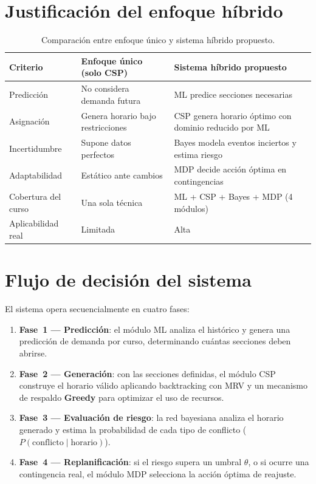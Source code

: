 \documentclass[12pt,twoside]{report}
\theoremstyle{definition}
\begin{document}
\section{Justificaci\'on del enfoque h\'ibrido}

\begin{table}[H]
\centering
\caption{Comparaci\'on entre enfoque \'unico y sistema h\'ibrido propuesto.}
\label{tab:justif}
\begin{tabularx}{\linewidth}{lXX}
\toprule
\textbf{Criterio} & \textbf{Enfoque \'unico (solo CSP)} &
  \textbf{Sistema h\'ibrido propuesto} \\
\midrule
Predicci\'on & No considera demanda futura &
  ML predice secciones necesarias \\
Asignaci\'on & Genera horario bajo restricciones &
  CSP genera horario \'optimo con dominio reducido por ML \\
Incertidumbre & Supone datos perfectos &
  Bayes modela eventos inciertos y estima riesgo \\
Adaptabilidad & Est\'atico ante cambios &
  MDP decide acci\'on \'optima en contingencias \\
Cobertura del curso & Una sola t\'ecnica &
  ML + CSP + Bayes + MDP (4 m\'odulos) \\
Aplicabilidad real & Limitada & Alta \\
\bottomrule
\end{tabularx}
\end{table}

\section{Flujo de decisi\'on del sistema}

El sistema opera secuencialmente en cuatro fases:

\begin{enumerate}[leftmargin=2em,itemsep=5pt]
  \item \textbf{Fase~1 --- Predicci\'on}: el m\'odulo ML analiza el hist\'orico y
    genera una predicci\'on de demanda por curso, determinando cu\'antas secciones
    deben abrirse.
  \item \textbf{Fase~2 --- Generaci\'on}: con las secciones definidas, el m\'odulo CSP construye el horario v\'alido aplicando backtracking con MRV y un mecanismo de respaldo \textbf{Greedy} para optimizar el uso de recursos.
  \item \textbf{Fase~3 --- Evaluaci\'on de riesgo}: la red bayesiana analiza el
    horario generado y estima la probabilidad de cada tipo de conflicto
    ($P(\text{conflicto} \mid \text{horario})$).
  \item \textbf{Fase~4 --- Replanificaci\'on}: si el riesgo supera un umbral
    $\theta$, o si ocurre una contingencia real, el m\'odulo MDP selecciona la
    acci\'on \'optima de reajuste.
\end{enumerate}
\end{document}
